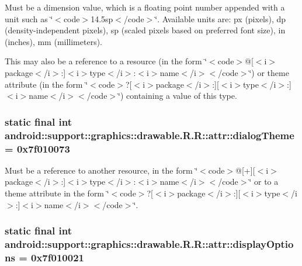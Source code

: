 Must be a dimension value, which is a floating point number appended with a unit such as \char`\"{}$<$code$>$14.5sp$<$/code$>$\char`\"{}. Available units are: px (pixels), dp (density-independent pixels), sp (scaled pixels based on preferred font size), in (inches), mm (millimeters). 

This may also be a reference to a resource (in the form \char`\"{}$<$code$>$@\mbox{[}$<$i$>$package$<$/i$>$:\mbox{]}$<$i$>$type$<$/i$>$:$<$i$>$name$<$/i$>$$<$/code$>$\char`\"{}) or theme attribute (in the form \char`\"{}$<$code$>$?\mbox{[}$<$i$>$package$<$/i$>$:\mbox{]}\mbox{[}$<$i$>$type$<$/i$>$:\mbox{]}$<$i$>$name$<$/i$>$$<$/code$>$\char`\"{}) containing a value of this type. \hypertarget{classandroid_1_1support_1_1graphics_1_1drawable_1_1_r_1_1attr_9816ec1c601a1df93709054d5c37bc57}{
\subsubsection[{dialogTheme}]{\setlength{\rightskip}{0pt plus 5cm}static final int android::support::graphics::drawable.R.R::attr::dialogTheme = 0x7f010073}}
\label{classandroid_1_1support_1_1graphics_1_1drawable_1_1_r_1_1attr_9816ec1c601a1df93709054d5c37bc57}


Must be a reference to another resource, in the form \char`\"{}$<$code$>$@\mbox{[}+\mbox{]}\mbox{[}$<$i$>$package$<$/i$>$:\mbox{]}$<$i$>$type$<$/i$>$:$<$i$>$name$<$/i$>$$<$/code$>$\char`\"{} or to a theme attribute in the form \char`\"{}$<$code$>$?\mbox{[}$<$i$>$package$<$/i$>$:\mbox{]}\mbox{[}$<$i$>$type$<$/i$>$:\mbox{]}$<$i$>$name$<$/i$>$$<$/code$>$\char`\"{}. \hypertarget{classandroid_1_1support_1_1graphics_1_1drawable_1_1_r_1_1attr_097f585b677683cf9ac9af0f4fdc3024}{
\subsubsection[{displayOptions}]{\setlength{\rightskip}{0pt plus 5cm}static final int android::support::graphics::drawable.R.R::attr::displayOptions = 0x7f010021}}
\label{classandroid_1_1support_1_1graphics_1_1drawable_1_1_r_1_1attr_097f585b677683cf9ac9af0f4fdc3024}


